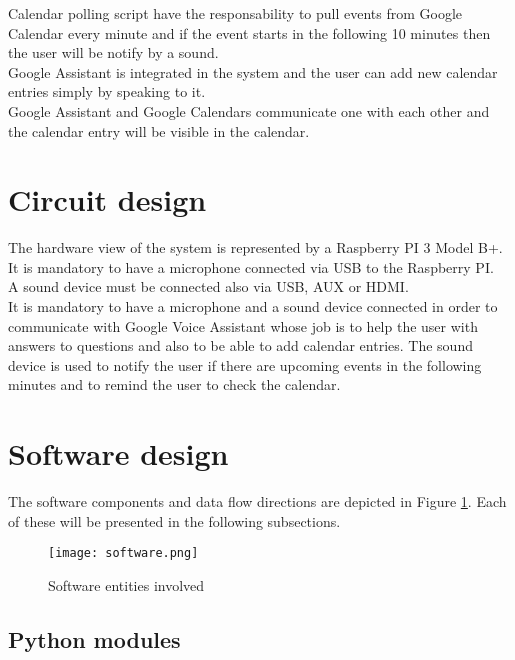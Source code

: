\documentclass[a4paper,11pt]{article}
\begin{document}
Calendar polling script have the responsability to pull events from Google Calendar every minute and if the event starts in the following 10 minutes then the user will be notify by a sound.\\

Google Assistant is integrated in the system and the user can add new calendar entries simply by speaking to it.\\

Google Assistant and Google Calendars communicate one with each other and the calendar entry will be visible in the calendar.\\

\section{Circuit design}

The hardware view of the system is represented by a Raspberry PI 3 Model B+.\\

It is mandatory to have a microphone connected via USB to the Raspberry PI.\\

A sound device must be connected also via USB, AUX or HDMI.\\

It is mandatory to have a microphone and a sound device connected in order to communicate with Google Voice Assistant whose job is to help the user with answers to questions and also to be able to add calendar entries. The sound device is used to notify the user if there are upcoming events in the following minutes and to remind the user to check the calendar.

\section{Software design}

The software components and data flow directions are depicted in Figure \ref{fig:software}. Each of these will be presented in the following subsections.\\

\begin{figure}[h]
\centering
\texttt{[image: software.png]}
\caption{Software entities involved}
\label{fig:software}
\end{figure}
 
\subsection{Python modules}
\end{document}
